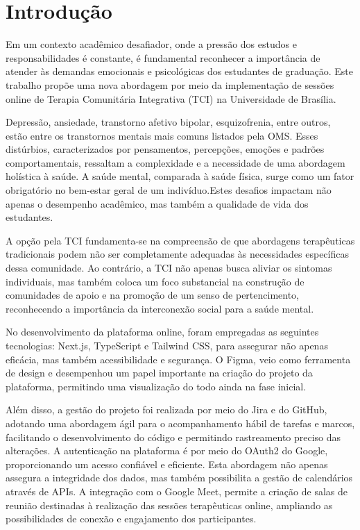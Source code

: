 \chapter*[Introdução]{Introdução}
Em um contexto acadêmico desafiador, onde a pressão dos estudos e responsabilidades é constante, é fundamental reconhecer a importância de atender às demandas emocionais e psicológicas dos estudantes de graduação. Este trabalho propõe uma nova abordagem por meio da implementação de sessões online de Terapia Comunitária Integrativa (TCI) na Universidade de Brasília.

Depressão, ansiedade, transtorno afetivo bipolar, esquizofrenia, entre outros, estão entre os transtornos mentais mais comuns listados pela OMS. Esses distúrbios, caracterizados por pensamentos, percepções, emoções e padrões comportamentais, ressaltam a complexidade e a necessidade de uma abordagem holística à saúde. A saúde mental, comparada à saúde física, surge como um fator obrigatório no bem-estar geral de um indivíduo.\cite{EMMA}Estes desafios impactam não apenas o desempenho acadêmico, mas também a qualidade de vida dos estudantes.

A opção pela TCI fundamenta-se na compreensão de que abordagens terapêuticas tradicionais podem não ser completamente adequadas às necessidades específicas dessa comunidade. Ao contrário, a TCI não apenas busca aliviar os sintomas individuais, mas também coloca um foco substancial na construção de comunidades de apoio e na promoção de um senso de pertencimento, reconhecendo a importância da interconexão social para a saúde mental.

No desenvolvimento da plataforma online, foram empregadas as seguintes tecnologias: Next.js, TypeScript e Tailwind CSS, para assegurar não apenas eficácia, mas também acessibilidade e segurança. O Figma, veio como ferramenta de design e desempenhou um papel importante na criação do projeto da plataforma, permitindo uma visualização do todo ainda na fase inicial.

Além disso, a gestão do projeto foi realizada por meio do Jira e do GitHub, adotando uma abordagem ágil para o acompanhamento hábil de tarefas e marcos, facilitando o desenvolvimento do código e permitindo rastreamento preciso das alterações. A autenticação na plataforma é por meio do OAuth2 do Google, proporcionando um acesso confiável e eficiente. Esta abordagem não apenas assegura a integridade dos dados, mas também possibilita a gestão de calendários através de APIs. A integração com o Google Meet, permite a criação de salas de reunião destinadas à realização das sessões terapêuticas online, ampliando as possibilidades de conexão e engajamento dos participantes.

